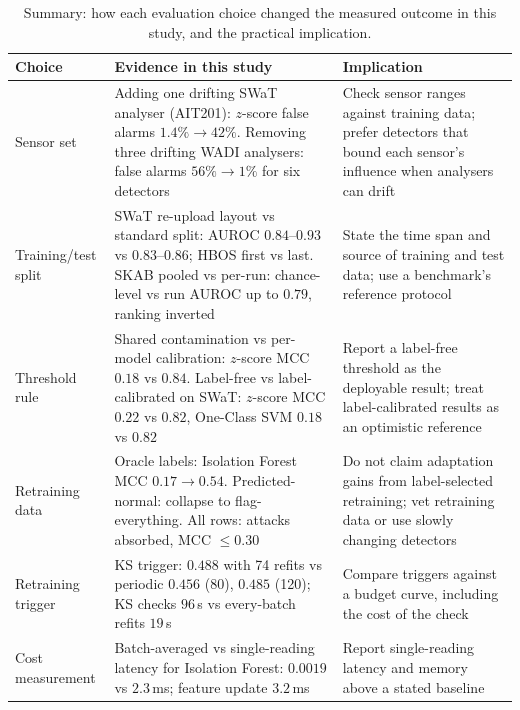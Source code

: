 \documentclass[11pt]{article}
\begin{document}
\begin{table}[t]
\centering\small
\caption{Summary: how each evaluation choice changed the measured outcome in this study,
and the practical implication.}
\label{tab:synth}
\begin{tabular}{p{}p{}p{}}
\toprule
Choice & Evidence in this study & Implication \\
\midrule
Sensor set & Adding one drifting SWaT analyser (AIT201): $z$-score false alarms $1.4\%\to42\%$. Removing three drifting WADI analysers: false alarms $56\%\to1\%$ for six detectors & Check sensor ranges against training data; prefer detectors that bound each sensor's influence when analysers can drift \\
Training/test split & SWaT re-upload layout vs standard split: AUROC $0.84$--$0.93$ vs $0.83$--$0.86$; HBOS first vs last. SKAB pooled vs per-run: chance-level vs run AUROC up to $0.79$, ranking inverted & State the time span and source of training and test data; use a benchmark's reference protocol \\
Threshold rule & Shared contamination vs per-model calibration: $z$-score MCC $0.18$ vs $0.84$. Label-free vs label-calibrated on SWaT: $z$-score MCC $0.22$ vs $0.82$, One-Class SVM $0.18$ vs $0.82$ & Report a label-free threshold as the deployable result; treat label-calibrated results as an optimistic reference \\
Retraining data & Oracle labels: Isolation Forest MCC $0.17\to0.54$. Predicted-normal: collapse to flag-everything. All rows: attacks absorbed, MCC $\le0.30$ & Do not claim adaptation gains from label-selected retraining; vet retraining data or use slowly changing detectors \\
Retraining trigger & KS trigger: $0.488$ with 74 refits vs periodic $0.456$ (80), $0.485$ (120); KS checks $96$\,s vs every-batch refits $19$\,s & Compare triggers against a budget curve, including the cost of the check \\
Cost measurement & Batch-averaged vs single-reading latency for Isolation Forest: $0.0019$ vs $2.3$\,ms; feature update $3.2$\,ms & Report single-reading latency and memory above a stated baseline \\
\bottomrule
\end{tabular}
\end{table}
\end{document}
